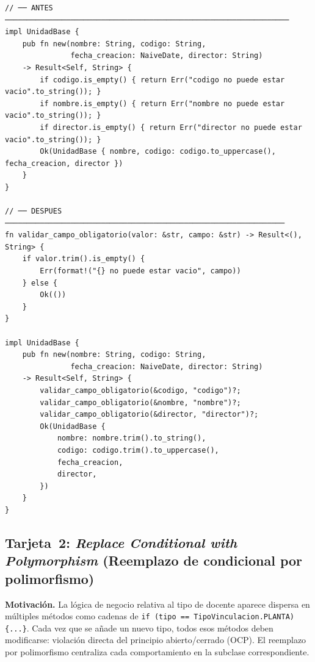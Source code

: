 \begin{lstlisting}[style=rustStyle,
  caption={\textit{Extract Method} en \rust: extracción a función privada de validación.},
  label={lst:refact-extract-rust}]
// ── ANTES ─────────────────────────────────────────────────────────────────
impl UnidadBase {
    pub fn new(nombre: String, codigo: String,
               fecha_creacion: NaiveDate, director: String)
    -> Result<Self, String> {
        if codigo.is_empty() { return Err("codigo no puede estar vacio".to_string()); }
        if nombre.is_empty() { return Err("nombre no puede estar vacio".to_string()); }
        if director.is_empty() { return Err("director no puede estar vacio".to_string()); }
        Ok(UnidadBase { nombre, codigo: codigo.to_uppercase(), fecha_creacion, director })
    }
}

// ── DESPUES ────────────────────────────────────────────────────────────────
fn validar_campo_obligatorio(valor: &str, campo: &str) -> Result<(), String> {
    if valor.trim().is_empty() {
        Err(format!("{} no puede estar vacio", campo))
    } else {
        Ok(())
    }
}

impl UnidadBase {
    pub fn new(nombre: String, codigo: String,
               fecha_creacion: NaiveDate, director: String)
    -> Result<Self, String> {
        validar_campo_obligatorio(&codigo, "codigo")?;
        validar_campo_obligatorio(&nombre, "nombre")?;
        validar_campo_obligatorio(&director, "director")?;
        Ok(UnidadBase {
            nombre: nombre.trim().to_string(),
            codigo: codigo.trim().to_uppercase(),
            fecha_creacion,
            director,
        })
    }
}
\end{lstlisting}

\subsection{Tarjeta~2: \textit{Replace Conditional with Polymorphism} (Reemplazo de condicional por polimorfismo)}
\label{subsec:refact-polymorphism}

\textbf{Motivación.} La lógica de negocio relativa al tipo de docente aparece dispersa en
múltiples métodos como cadenas de \texttt{if (tipo == TipoVinculacion.PLANTA) \{...\}}.
Cada vez que se añade un nuevo tipo, todos esos métodos deben modificarse: violación
directa del principio abierto/cerrado (OCP). El reemplazo por polimorfismo centraliza
cada comportamiento en la subclase correspondiente.

